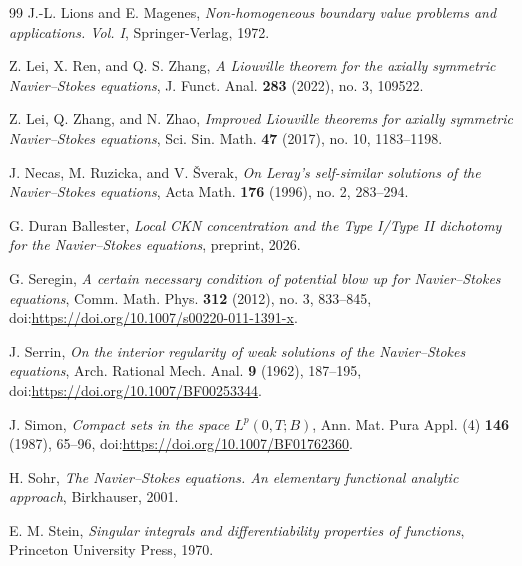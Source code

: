 \documentclass[11pt]{amsart}
\theoremstyle{plain}
\theoremstyle{definition}
\theoremstyle{remark}
\numberwithin{equation}{section}
\begin{document}
\begin{thebibliography}{99}
J.-L. Lions and E. Magenes,
\emph{Non-homogeneous boundary value problems and applications. Vol. I},
Springer-Verlag, 1972.

Z. Lei, X. Ren, and Q. S. Zhang,
\emph{A Liouville theorem for the axially symmetric Navier--Stokes equations},
J. Funct. Anal. \textbf{283} (2022), no. 3, 109522.

Z. Lei, Q. Zhang, and N. Zhao,
\emph{Improved Liouville theorems for axially symmetric Navier--Stokes equations},
Sci. Sin. Math. \textbf{47} (2017), no. 10, 1183--1198.

J. Necas, M. Ruzicka, and V. \v{S}verak,
\emph{On Leray's self-similar solutions of the Navier--Stokes equations},
Acta Math. \textbf{176} (1996), no. 2, 283--294.

G. Duran Ballester,
\emph{Local CKN concentration and the Type I/Type II dichotomy for the
Navier--Stokes equations},
preprint, 2026.

G. Seregin,
\emph{A certain necessary condition of potential blow up for Navier--Stokes equations},
Comm. Math. Phys. \textbf{312} (2012), no. 3, 833--845,
doi:\url{https://doi.org/10.1007/s00220-011-1391-x}.

J. Serrin,
\emph{On the interior regularity of weak solutions of the Navier--Stokes equations},
Arch. Rational Mech. Anal. \textbf{9} (1962), 187--195,
doi:\url{https://doi.org/10.1007/BF00253344}.

J. Simon,
\emph{Compact sets in the space \(L^p(0,T;B)\)},
Ann. Mat. Pura Appl. (4) \textbf{146} (1987), 65--96,
doi:\url{https://doi.org/10.1007/BF01762360}.

H. Sohr,
\emph{The Navier--Stokes equations. An elementary functional analytic approach},
Birkhauser, 2001.

E. M. Stein,
\emph{Singular integrals and differentiability properties of functions},
Princeton University Press, 1970.

\end{thebibliography}
\end{document}
